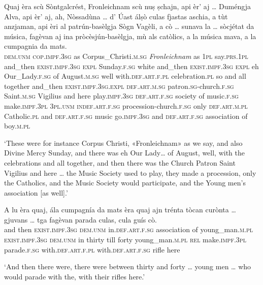 \begin{linenumbers}
\gll    Quaj èra scù Sòntgalcrést, Fronleichnam scù nuṣ ṣchajn, api èr' aj … Duméngja Alva, api  èr’ aj, ah, Nòssadùna … d’ Úast álṣò culas fjastas aschia, a tùt anzjaman, api èri al patrún-basèlgja Sògn Vagèli, a cò … sunava la … sòcjétat da música, fagèvan aj ina pròcèsjún-basèlgja, mù als catòlics, a la música mava, a la cumpagnia da mats.\\
\textsc{dem.unm} \textsc{cop.impf.3sg} as  Corpus\_Christi.\textsc{m.sg} \textit{Fronleichnam}\footnotemark{} as \textsc{1pl} say.\textsc{prs.1pl} and\_then \textsc{exist.impf.3sg} \textsc{expl} {} Sunday.\textsc{f.sg} white and\_then \textsc{exist.impf.3sg} \textsc{expl} eh Our\_Lady.\textsc{f.sg} {} of August.\textsc{m.sg} well with.\textsc{def.art.f.pl} celebration.\textsc{pl} so and all together and\_then \textsc{exist.impf.3sg.expl} \textsc{def.art.m.sg} patron.\textsc{sg}-church.\textsc{f.sg} Saint.\textsc{m.sg} Vigilius and here {} play.\textsc{impf.3sg} \textsc{def.art.f.sg} {} society of music.\textsc{f.sg} make.\textsc{impf.3pl} \textsc{3pl.unm} \textsc{indef.art.f.sg} procession-church.\textsc{f.sg} only \textsc{def.art.m.pl} Catholic.\textsc{pl} and \textsc{def.art.f.sg} music  go.\textsc{impf.3sg} and \textsc{def.art.f.sg} association of boy.\textsc{m.pl}\\
\end{linenumbers}
\medskip
\glt `These were for instance Corpus Christi, «Fronleichnam» as we say, and also Divine Mercy Sunday, and there was eh Our Lady… of August, well, with the celebrations and all together, and then there was the Church Patron Saint Vigilius and here … the Music Society used to play, they made a procession, only the Catholics, and the Music Society would participate, and the Young men's association [as well].'
\medskip

\begin{linenumbers}
\gll    A lu èra quaj, ála cumpagnía da mats èra quaj ajn trénta tòcan curònta … gjuvans … tga fagèvan parada culas, cula guís cò.\\
and then \textsc{exist.impf.3sg} \textsc{dem.unm} in.\textsc{def.art.f.sg} association of young\_man.\textsc{m.pl} \textsc{exist.impf.3sg} \textsc{dem.unm} in thirty till forty {} young\_man.\textsc{m.pl} {} \textsc{rel} make.\textsc{impf.3pl}  parade.\textsc{f.sg} with.\textsc{def.art.f.pl} with.\textsc{def.art.f.sg} rifle here \\
\end{linenumbers}
\medskip
\glt `And then there were, there were between thirty and forty … young men … who would parade with the, with their rifles here.'
\medskip


